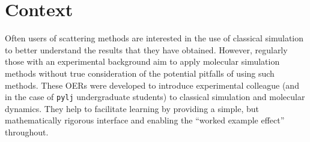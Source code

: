 \section*{Context}
Often users of scattering methods are interested in the use of classical simulation to better understand the results that they have obtained.
However, regularly those with an experimental background aim to apply molecular simulation methods without true consideration of the potential pitfalls of using such methods.
These OERs were developed to introduce experimental colleague (and in the case of \texttt{pylj} undergraduate students) to classical simulation and molecular dynamics.
They help to facilitate learning by providing a simple, but mathematically rigorous interface and enabling the ``worked example effect'' throughout.
